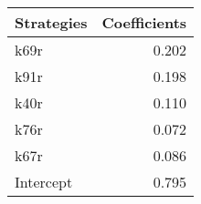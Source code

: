 \begin{tabular}{lr}
\toprule
Strategies &  Coefficients \\
\midrule
      k69r &         0.202 \\
      k91r &         0.198 \\
      k40r &         0.110 \\
      k76r &         0.072 \\
      k67r &         0.086 \\
 Intercept &         0.795 \\
\bottomrule
\end{tabular}
